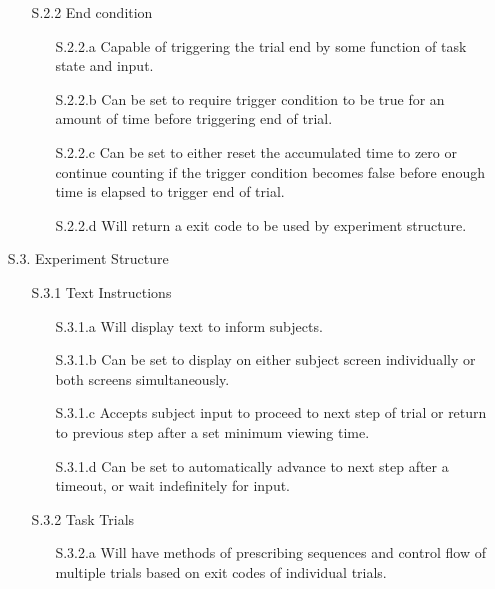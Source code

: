 \documentclass{article}
\begin{document}
\begin{enumerate}
\begin{enumerate}
        \item[S.2.2]  End condition
            \begin{enumerate}
            \item[S.2.2.a] Capable of triggering the trial end by some function of task state and input.
            \item[S.2.2.b] Can be set to require trigger condition to be true for an amount of time before triggering end of trial.
            \item[S.2.2.c] Can be set to either reset the accumulated time to zero or continue counting if the trigger condition becomes false before enough time is elapsed to trigger end of trial.
            \item[S.2.2.d] Will return a exit code to be used by experiment structure.
            \end{enumerate}

        \end{enumerate}

       
    \item[S.3.] Experiment Structure
        \begin{enumerate}
        \item[S.3.1] Text Instructions
            \begin{enumerate}
            \item[S.3.1.a] Will display text to inform subjects.
            \item[S.3.1.b] Can be set to display on either subject screen individually or both screens simultaneously.
            \item[S.3.1.c] Accepts subject input to proceed to next step of trial or return to previous step after a set minimum viewing time.
            \item[S.3.1.d] Can be set to automatically advance to next step after a timeout, or wait indefinitely for input.
            \end{enumerate}

        \item[S.3.2] Task Trials
            \begin{enumerate}
            \item[S.3.2.a] Will have methods of prescribing sequences and
                control flow of multiple trials based on exit codes of individual trials.
            \end{enumerate}
        \end{enumerate}

    \end{enumerate}
\end{document}

